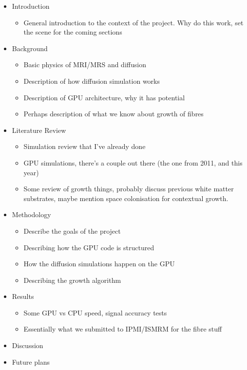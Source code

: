 \begin{itemize}
	\item Introduction
	\begin{itemize}
		\item General introduction to the context of the project. Why do this work, set the scene for the coming sections
	\end{itemize}
	\item Background
	\begin{itemize}
		\item Basic physics of MRI/MRS and diffusion
		\item Description of how diffusion simulation works 
		\item Description of GPU architecture, why it has potential
		\item Perhaps description of what we know about growth of fibres
	\end{itemize}
	\item Literature Review
	\begin{itemize}
		\item Simulation review that I've already done
		\item GPU simulations, there's a couple out there (the one from 2011, and this year)
		\item Some review of growth things, probably discuss previous white matter substrates, maybe mention space colonisation for contextual growth.
	\end{itemize}
      \item Methodology  
	\begin{itemize}
          \item Describe the goals of the project
		\item Describing how the GPU code is structured
		\item How the diffusion simulations happen on the GPU
		\item Describing the growth algorithm 
	\end{itemize}
	\item Results
	\begin{itemize}
		\item Some GPU vs CPU speed, signal accuracy tests
		\item Essentially what we submitted to IPMI/ISMRM for the fibre stuff 
	\end{itemize}
      \item Discussion
      \item Future plans
\end{itemize}

